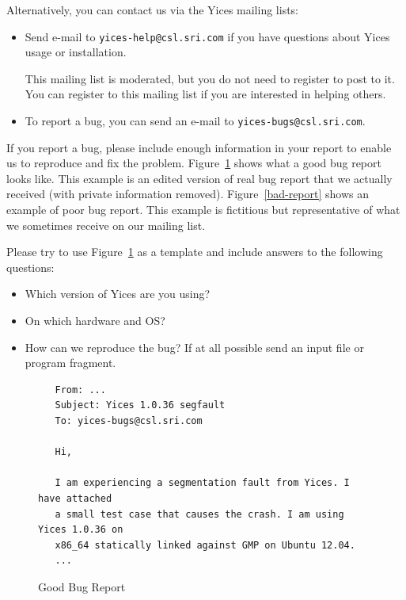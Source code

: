 \documentclass[11pt,twoside,fleqn,openright,titlepage]{cslreport}
\begin{document}
\medskip\noindent
Alternatively, you can contact us via the Yices mailing lists:
\begin{itemize}
\item Send e-mail to \texttt{yices-help@csl.sri.com} if you have
  questions about Yices usage or installation.

  This mailing list is moderated, but you do not need to register to
  post to it. You can register to this mailing list if you are
  interested in helping others.

\item To report a bug, you can send an e-mail to \texttt{yices-bugs@csl.sri.com}.
\end{itemize}
If you report a bug, please include enough information in your report
to enable us to reproduce and fix the
problem. Figure~\ref{good-report} shows what a good bug report looks
like. This example is an edited version of real bug report that we
actually received (with private information
removed). Figure~\ref{bad-report} shows an example of poor bug
report. This example is fictitious but representative of what we
sometimes receive on our mailing list.

\medskip\noindent
Please try to use Figure~\ref{good-report} as a template and include
answers to the following questions:
\begin{itemize}
\item Which version of Yices are you using?
\item On which hardware and OS?
\item How can we reproduce the bug? If at all possible send an input file
or program fragment.
\end{itemize}


\begin{figure}
\begin{center}
\begin{footnotesize}
\begin{verbatim}
   From: ...
   Subject: Yices 1.0.36 segfault
   To: yices-bugs@csl.sri.com

   Hi,

   I am experiencing a segmentation fault from Yices. I have attached
   a small test case that causes the crash. I am using Yices 1.0.36 on
   x86_64 statically linked against GMP on Ubuntu 12.04.
   ...
\end{verbatim}
\end{footnotesize}
\end{center}
\caption{Good Bug Report}
\label{good-report}
\end{figure}
\end{document}
